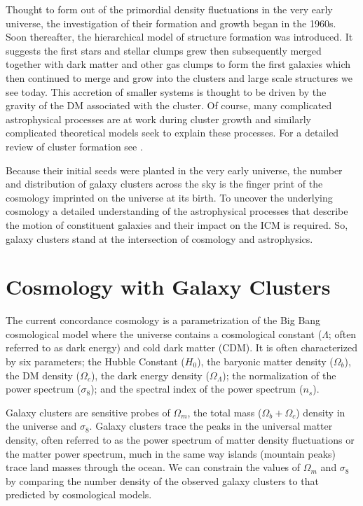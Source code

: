 Thought to form out of the primordial density fluctuations in the very early universe, the investigation of their formation and growth began in the 1960s. Soon thereafter, the hierarchical model of structure formation \citep{Press1974, Gott1975, White1978} was introduced. It suggests the first stars and stellar clumps grew then subsequently merged together with dark matter and other gas clumps to form the first galaxies which then continued to merge and grow into the clusters and large scale structures we see today. This accretion of smaller systems is thought to be driven by the gravity of the DM associated with the cluster. Of course, many complicated astrophysical processes are at work during cluster growth and similarly complicated theoretical models seek to explain these processes. For a detailed review of cluster formation see \cite{Kravtsov2012}.

Because their initial seeds were planted in the very early universe, the number and distribution of galaxy clusters across the sky is the finger print of the cosmology imprinted on the universe at its birth. To uncover the underlying cosmology a detailed understanding of the astrophysical processes that describe the motion of constituent galaxies and their impact on the ICM is required. So, galaxy clusters stand at the intersection of cosmology and astrophysics. 

\section{Cosmology with Galaxy Clusters}
The current concordance cosmology is a parametrization of the Big Bang cosmological model where the universe contains a cosmological constant ($\Lambda$; often referred to as dark energy) and cold dark matter (CDM). It is often characterized by six parameters; the Hubble Constant ($H_0$), the baryonic matter density ($\Omega_b$), the DM density ($\Omega_c$), the dark energy density ($\Omega_\Lambda$); the normalization of the power spectrum ($\sigma_8$); and the spectral index of the power spectrum ($n_s$). 

Galaxy clusters are sensitive probes of $\Omega_m$, the total mass ($\Omega_b + \Omega_c$) density in the universe and $\sigma_8$. Galaxy clusters trace the peaks in the universal matter density, often referred to as the power spectrum of matter density fluctuations or the matter power spectrum, much in the same way islands (mountain peaks) trace land masses through the ocean. We can constrain the values of $\Omega_m$ and $\sigma_8$ by comparing the number density of the observed galaxy clusters to that predicted by cosmological models.

